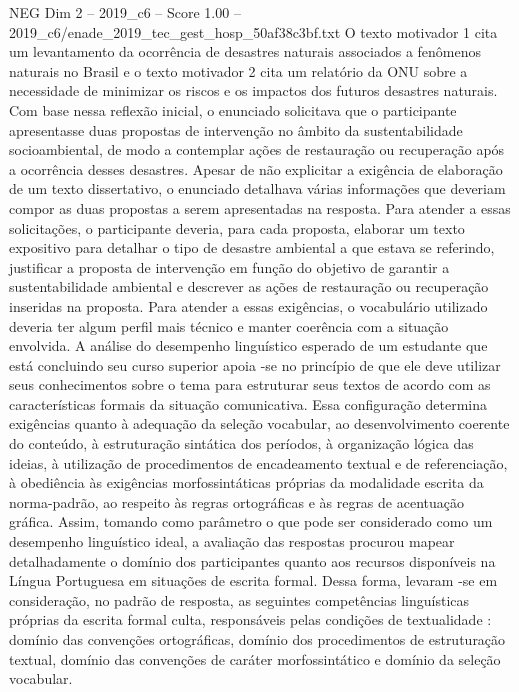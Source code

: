 \begin{textsample}{NEG Dim 2 – 2019\_c6 – Score 1.00 – 2019\_c6/enade\_2019\_tec\_gest\_hosp\_50af38c3bf.txt}
O texto motivador 1 cita um levantamento da ocorrência de desastres naturais associados a fenômenos naturais no Brasil e o texto motivador 2 cita um relatório da ONU sobre a necessidade de minimizar os riscos e os impactos dos futuros desastres naturais.
Com base nessa reflexão inicial, o enunciado solicitava que o participante apresentasse duas propostas de intervenção no âmbito da sustentabilidade socioambiental, de modo a contemplar ações de restauração ou recuperação após a ocorrência desses desastres.
Apesar de não explicitar a exigência de elaboração de um texto dissertativo, o enunciado detalhava várias informações que deveriam compor as duas propostas a serem apresentadas na resposta.
Para atender a essas solicitações, o participante deveria, para cada proposta, elaborar um texto expositivo para detalhar o tipo de desastre ambiental a que estava se referindo, justificar a proposta de intervenção em função do objetivo de garantir a sustentabilidade ambiental e descrever as ações de restauração ou recuperação inseridas na proposta.
Para atender a essas exigências, o vocabulário utilizado deveria ter algum perfil mais técnico e manter coerência com a situação envolvida.
A análise do desempenho linguístico esperado de um estudante que está concluindo seu curso superior apoia -se no princípio de que ele deve utilizar seus conhecimentos sobre o tema para estruturar seus textos de acordo com as características formais da situação comunicativa.
Essa configuração determina exigências quanto à adequação da seleção vocabular, ao desenvolvimento coerente do conteúdo, à estruturação sintática dos períodos, à organização lógica das ideias, à utilização de procedimentos de encadeamento textual e de referenciação, à obediência às exigências morfossintáticas próprias da modalidade escrita da norma-padrão, ao respeito às regras ortográficas e às regras de acentuação gráfica.
Assim, tomando como parâmetro o que pode ser considerado como um desempenho linguístico ideal, a avaliação das respostas procurou mapear detalhadamente o domínio dos participantes quanto aos recursos disponíveis na Língua Portuguesa em situações de escrita formal.
Dessa forma, levaram -se em consideração, no padrão de resposta, as seguintes competências linguísticas próprias da escrita formal culta, responsáveis pelas condições de textualidade : domínio das convenções ortográficas, domínio dos procedimentos de estruturação textual, domínio das convenções de caráter morfossintático e domínio da seleção vocabular.

\end{textsample}
